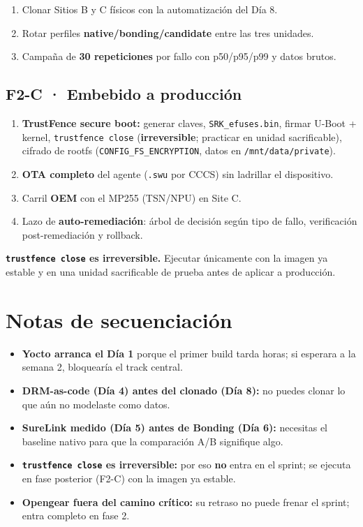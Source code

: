 \documentclass[11pt,a4paper]{article}
\newcommand{\file}[1]{\texttt{#1}}
\begin{document}
\begin{enumerate}
  \item Clonar Sitios B y C físicos con la automatización del Día 8.
  \item Rotar perfiles \textbf{native/bonding/candidate} entre las tres unidades.
  \item Campaña de \textbf{30 repeticiones} por fallo con p50/p95/p99 y datos brutos.
\end{enumerate}

\subsection{F2-C · Embebido a producción}

\begin{enumerate}
  \item \textbf{TrustFence secure boot:} generar claves, \file{SRK\_efuses.bin},
        firmar U-Boot + kernel, \file{trustfence close}
        (\textbf{irreversible}; practicar en unidad sacrificable),
        cifrado de rootfs (\file{CONFIG\_FS\_ENCRYPTION}, datos en \file{/mnt/data/private}).
  \item \textbf{OTA completo} del agente (\file{.swu} por CCCS) sin ladrillar el dispositivo.
  \item Carril \textbf{OEM} con el MP255 (TSN/NPU) en Site C.
  \item Lazo de \textbf{auto-remediación}: árbol de decisión según tipo de fallo,
        verificación post-remediación y rollback.
\end{enumerate}

\begin{aviso}
\small
\textbf{\file{trustfence close} es irreversible.} Ejecutar únicamente con la imagen ya estable
y en una unidad sacrificable de prueba antes de aplicar a producción.
\end{aviso}

\section{Notas de secuenciación}

\begin{itemize}
  \item \textbf{Yocto arranca el Día 1} porque el primer build tarda horas; si esperara a la
        semana 2, bloquearía el track central.
  \item \textbf{DRM-as-code (Día 4) antes del clonado (Día 8):} no puedes clonar lo que aún no
        modelaste como datos.
  \item \textbf{SureLink medido (Día 5) antes de Bonding (Día 6):} necesitas el baseline nativo
        para que la comparación A/B signifique algo.
  \item \textbf{\file{trustfence close} es irreversible:} por eso \textbf{no} entra en el sprint;
        se ejecuta en fase posterior (F2-C) con la imagen ya estable.
  \item \textbf{Opengear fuera del camino crítico:} su retraso no puede frenar el sprint;
        entra completo en fase 2.
\end{itemize}
\end{document}
